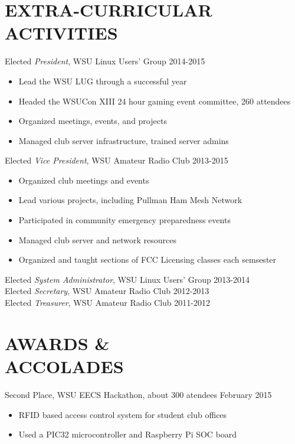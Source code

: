 \documentclass[line, margin]{res}
\begin{document}
\begin{resume}
\section{EXTRA-CURRICULAR \\ ACTIVITIES}             
            Elected {\it President}, WSU Linux Users' Group \hfill 2014-2015
        \begin{itemize} \itemsep -2pt
                \item Lead the WSU LUG through a successful year
                \item Headed the WSUCon XIII 24 hour gaming event committee, 260 attendees
                \item Organized meetings, events, and projects
                \item Managed club server infrastructure, trained server admins
            \end{itemize}
            Elected {\it Vice President}, WSU Amateur Radio Club \hfill 2013-2015
        \begin{itemize} \itemsep -2pt
                \item Organized club meetings and events
                \item Lead various projects, including Pullman Ham Mesh Network
                \item Participated in community emergency preparedness events
                \item Managed club server and network resources
                \item Organized and taught sections of FCC Licensing classes each semsester
            \end{itemize}

            Elected {\it System Administrator}, WSU Linux Users' Group \hfill 2013-2014\\
            Elected {\it Secretary}, WSU Amateur Radio Club \hfill 2012-2013\\
            Elected {\it Treasurer}, WSU Amateur Radio Club \hfill 2011-2012\\

\section{AWARDS \& \\ ACCOLADES}
            Second Place, WSU EECS Hackathon, about 300 atendees \hfill February 2015
        \begin{itemize} \itemsep -2pt
                \item RFID based access control system for student club offices
                \item Used a PIC32 microcontroller and Raspberry Pi SOC board
            \end{itemize}

\end{resume}
\end{document}
